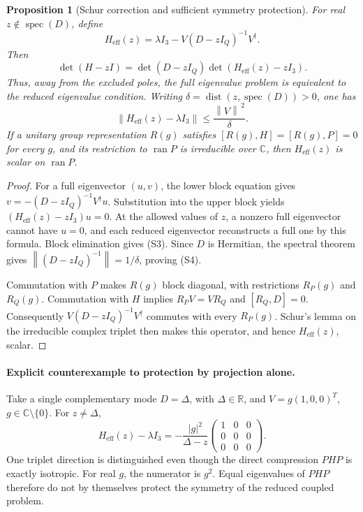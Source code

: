 \documentclass[a4paper,11pt]{article}
\newtheorem{proposition}{Proposition}
\newcommand{\norm}[1]{\left\lVert #1\right\rVert}
\newcommand{\ran}{\operatorname{ran}}
\newcommand{\spec}{\operatorname{spec}}
\begin{document}
\begin{proposition}[Schur correction and sufficient symmetry protection]
For real \(z\notin\spec(D)\), define
\begin{equation}
H_{\mathrm{eff}}(z)=\lambda I_3-V(D-zI_Q)^{-1}V^\dagger .
\tag{S2}
\end{equation}
Then
\begin{equation}
\det(H-zI)=\det(D-zI_Q)
           \det\!\left(H_{\mathrm{eff}}(z)-zI_3\right).
\tag{S3}
\end{equation}
Thus, away from the excluded poles, the full eigenvalue problem is
equivalent to the reduced eigenvalue condition.
Writing \(\delta=\operatorname{dist}(z,\spec(D))>0\), one has
\begin{equation}
\norm{H_{\mathrm{eff}}(z)-\lambda I_3}
\leq \frac{\norm{V}^{\,2}}{\delta}.
\tag{S4}
\end{equation}
If a unitary group representation \(R(g)\) satisfies
\([R(g),H]=[R(g),P]=0\) for every \(g\), and its restriction to
\(\ran P\) is irreducible over \(\mathbb C\), then
\(H_{\mathrm{eff}}(z)\) is scalar on \(\ran P\).
\end{proposition}

\begin{proof}
For a full eigenvector \((u,v)\), the lower block equation gives
\(v=-(D-zI_Q)^{-1}V^\dagger u\). Substitution into the upper block yields
\((H_{\mathrm{eff}}(z)-zI_3)u=0\). At the allowed values of \(z\), a
nonzero full eigenvector cannot have \(u=0\), and each reduced eigenvector
reconstructs a full one by this formula. Block elimination gives (S3).
Since \(D\) is Hermitian, the spectral theorem gives
\(\norm{(D-zI_Q)^{-1}}=1/\delta\), proving (S4).

Commutation with \(P\) makes \(R(g)\) block diagonal,
with restrictions \(R_P(g)\) and \(R_Q(g)\). Commutation with \(H\)
implies \(R_PV=VR_Q\) and \([R_Q,D]=0\).
Consequently \(V(D-zI_Q)^{-1}V^\dagger\) commutes with every \(R_P(g)\).
Schur's lemma on the irreducible complex triplet then makes this
operator, and hence \(H_{\mathrm{eff}}(z)\), scalar.
\end{proof}

\paragraph{Explicit counterexample to protection by projection alone.}
Take a single complementary mode \(D=\Delta\), with
\(\Delta\in\mathbb R\), and \(V=g(1,0,0)^T\), \(g\in\mathbb C\setminus\{0\}\).
For \(z\ne\Delta\),
\begin{equation}
H_{\mathrm{eff}}(z)-\lambda I_3
=-\frac{|g|^2}{\Delta-z}
  \begin{pmatrix}1&0&0\\0&0&0\\0&0&0\end{pmatrix}.
\tag{S5}
\end{equation}
One triplet direction is distinguished even though the direct compression
\(PHP\) is exactly isotropic. For real \(g\), the numerator is \(g^2\).
Equal eigenvalues of \(PHP\) therefore do not by themselves protect the
symmetry of the reduced coupled problem.
\end{document}

